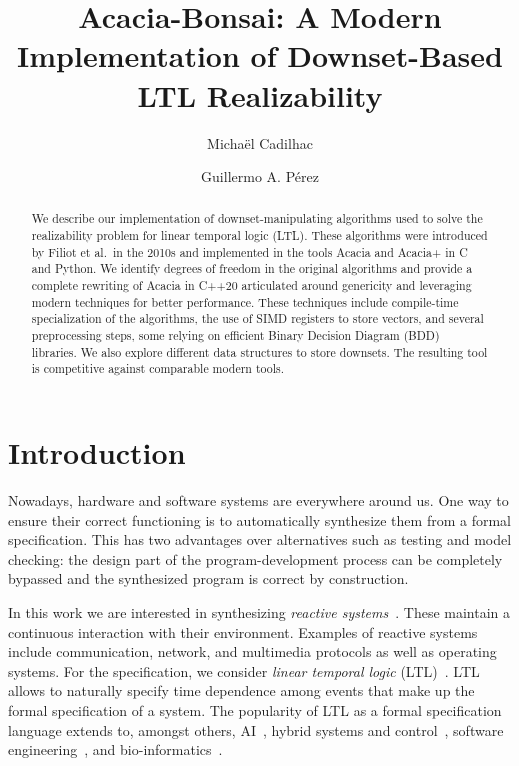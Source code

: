 \documentclass[runningheads,a4paper]{llncs}
\begin{document}
\title{Acacia-Bonsai: A Modern Implementation of Downset-Based LTL Realizability}

\author{Micha\"el Cadilhac
\and Guillermo A. P\'erez
}

\maketitle

\begin{abstract}
  We describe our implementation of downset-manipulating algorithms used to solve the
  realizability problem for linear temporal logic (LTL). These algorithms were
  introduced by Filiot et al.~in the 2010s and implemented in the tools Acacia
  and Acacia+ in C and Python.  We identify degrees of freedom in the original
  algorithms and provide a complete rewriting of Acacia in C++20 articulated
  around genericity and leveraging modern techniques for better performance.
  These techniques include compile-time specialization of the algorithms, the
  use of SIMD registers to store vectors, and several preprocessing steps, some
  relying on efficient Binary Decision Diagram (BDD) libraries.  We also explore
  different data structures to store downsets.  The resulting tool is
  competitive against comparable modern tools.
\end{abstract}

\section{Introduction}

Nowadays, hardware and software systems are everywhere around us. One way to
ensure their correct functioning is to automatically synthesize them from a
formal specification.  This has two advantages over alternatives such as
testing and model checking: the design part of the program-development process
can be completely bypassed and the synthesized program is correct by
construction.

In this work we are interested in synthesizing \emph{reactive
systems}~\cite{hp84}. These maintain a continuous interaction with their
environment.  Examples of reactive systems include communication, network, and
multimedia protocols as well as operating systems.  For the specification, we
consider \emph{linear temporal logic} (LTL)~\cite{pnueli77}. LTL allows to
naturally specify time dependence among events that make up the formal
specification of a system. The popularity of LTL as a formal specification
language extends to, amongst others, AI~\cite{gv16,cm19,gnpw20}, hybrid
systems and control~\cite{bvpyb16}, software engineering~\cite{lpb15}, and
bio-informatics~\cite{abbdfhinprs17}.
\end{document}
